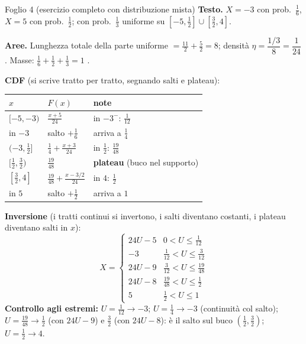 \begin{esempio}{Foglio 4 (esercizio completo con distribuzione mista)}
\textbf{Testo.} $X=-3$ con prob.\ $\tfrac16$, $X=5$ con prob.\ $\tfrac12$; con prob.\ $\tfrac13$ uniforme su $[-5,\tfrac12]\cup[\tfrac32,4]$.

\textbf{Aree.} Lunghezza totale della parte uniforme $=\tfrac{11}{2}+\tfrac52=8$; densità $\eta=\dfrac{1/3}{8}=\dfrac1{24}$. Masse: $\tfrac16+\tfrac12+\tfrac13=1$ \checkmark.

\textbf{CDF} (si scrive tratto per tratto, segnando salti e plateau):
\begin{center}\small
\begin{tabular}{lll}
\toprule
$x$ & $F(x)$ & note\\
\midrule
$[-5,-3)$ & $\tfrac{x+5}{24}$ & in $-3^-$: $\tfrac1{12}$\\
in $-3$ & salto $+\tfrac16$ & arriva a $\tfrac14$\\
$(-3,\tfrac12]$ & $\tfrac14+\tfrac{x+3}{24}$ & in $\tfrac12$: $\tfrac{19}{48}$\\
$[\tfrac12,\tfrac32)$ & $\tfrac{19}{48}$ & \textbf{plateau} (buco nel supporto)\\
$[\tfrac32,4]$ & $\tfrac{19}{48}+\tfrac{x-3/2}{24}$ & in $4$: $\tfrac12$\\
in $5$ & salto $+\tfrac12$ & arriva a $1$\\
\bottomrule
\end{tabular}
\end{center}
\textbf{Inversione} (i tratti continui si invertono, i salti diventano costanti, i plateau diventano salti in $x$):
\[
X=\begin{cases}
24U-5 & 0<U\le\tfrac1{12}\\
-3 & \tfrac1{12}<U\le\tfrac3{12}\\
24U-9 & \tfrac3{12}<U\le\tfrac{19}{48}\\
24U-8 & \tfrac{19}{48}<U\le\tfrac12\\
5 & \tfrac12<U\le1
\end{cases}
\]
\textbf{Controllo agli estremi:} $U=\tfrac1{12}\to-3$; $U=\tfrac14\to-3$ (continuità col salto); $U=\tfrac{19}{48}\to\tfrac12$ (con $24U-9$) e $\tfrac32$ (con $24U-8$): è il salto sul buco $(\tfrac12,\tfrac32)$; $U=\tfrac12\to4$.
\end{esempio}

